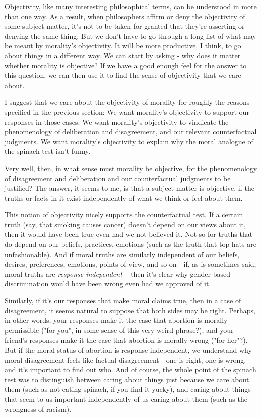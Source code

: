 Objectivity, like many interesting philosophical terms, can be understood in 
more than one way. As a result, when philosophers affirm or deny the objectivity of 
some subject matter, it's not to be taken for granted that they're asserting or denying 
the same thing. But we don't have to go through a long list of what may be meant by
morality's objectivity. It will be more productive, I think, to go about things in a different 
way. We can start by asking - why does it matter whether morality is objective? If we 
have a good enough feel for the answer to this question, we can then use it to find the 
sense of objectivity that we care about.  

I suggest that we care about the objectivity of morality for roughly the reasons 
specified in the previous section: We want morality's objectivity to support our 
responses in those cases. We want morality's objectivity to vindicate the 
phenomenology of deliberation and disagreement, and our relevant counterfactual 
judgments. We want morality’s objectivity to explain why the moral analogue of the 
spinach test isn’t funny.  

Very well, then, in what sense must morality be objective, for the 
phenomenology of disagreement and deliberation and our counterfactual judgments to 
be justified? The answer, it seems to me, is that a subject matter is objective, if the 
truths or facts in it exist independently of what we think or feel about them.  

This notion of objectivity nicely supports the counterfactual test. If a certain 
truth (say, that smoking causes cancer) doesn't depend on our views about it, then it 
would have been true even had we not believed it. Not so for truths that do depend on 
our beliefs, practices, emotions (such as the truth that top hats are unfashionable). And 
if moral truths are similarly independent of our beliefs, desires, preferences, emotions, 
points of view, and so on - if, as is sometimes said, moral truths are \emph{response-independent} – then it's clear why gender-based discrimination would have been wrong 
even had we approved of it.

Similarly, if it's our responses that make moral claims true, then in a case of 
disagreement, it seems natural to suppose that both sides may be right. Perhaps, in 
other words, your responses make it the case that abortion is morally permissible ("for 
you", in some sense of this very weird phrase?), and your friend's responses make it the 
case that abortion is morally wrong ("for her"?). But if the moral status of abortion is 
response-independent, we understand why moral disagreement feels like factual 
disagreement - one is right, one is wrong, and it's important to find out who. And of 
course, the whole point of the spinach test was to distinguish between caring about 
things just because we care about them (such as not eating spinach, if you find it yucky), 
and caring about things that seem to us important independently of us caring about 
them (such as the wrongness of racism).  

